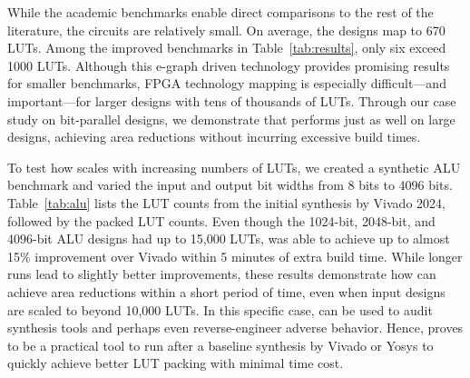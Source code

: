 While the academic benchmarks enable direct comparisons to the rest of the
literature, the circuits are relatively small. On average, the designs map to
670 LUTs. Among the \nimproved{} improved benchmarks in
Table~\ref{tab:results}, only six exceed 1000 LUTs. Although this e-graph
driven technology provides promising results for smaller benchmarks, FPGA
technology mapping is especially difficult---and important---for larger designs
with tens of thousands of LUTs. Through our case study on bit-parallel designs,
we demonstrate that \shortname{} performs just as well on large designs,
achieving area reductions without incurring excessive build times.

To test how \shortname{} scales with increasing numbers of LUTs, we created a
synthetic ALU benchmark and varied the input and output bit widths from 8 bits
to 4096 bits. Table~\ref{tab:alu} lists the LUT counts from the initial
synthesis by Vivado 2024, followed by the packed LUT counts. Even though the
1024-bit, 2048-bit, and 4096-bit ALU designs had up to 15,000 LUTs,
\shortname{} was able to achieve up to almost 15\% improvement over Vivado
within 5 minutes of extra build time. While longer runs lead to slightly better
improvements, these results demonstrate how \shortname{} can achieve area
reductions within a short period of time, even when input designs are scaled to
beyond 10,000 LUTs. In this specific case, \shortname{} can be used to audit
synthesis tools and perhaps even reverse-engineer adverse behavior. Hence,
\shortname{} proves to be a practical tool to run after a baseline synthesis by
Vivado or Yosys to quickly achieve better LUT packing with minimal time cost.
